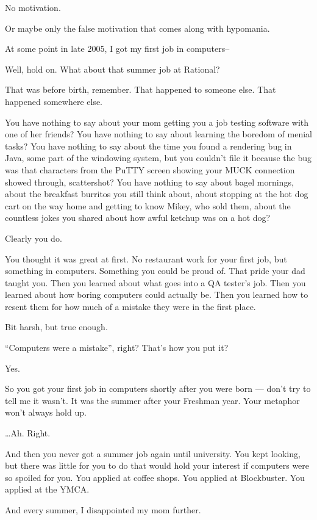 \begin{ally}
No motivation.
\end{ally}
Or maybe only the false motivation that comes along with hypomania.
\newpage

At some point in late 2005, I got my first job in computers--

\begin{ally}
Well, hold on. What about that summer job at Rational?
\end{ally}
That was before birth, remember. That happened to someone else. That happened somewhere else.

\begin{ally}
You have nothing to say about your mom getting you a job testing software with one of her friends? You have nothing to say about learning the boredom of menial tasks? You have nothing to say about the time you found a rendering bug in Java, some part of the windowing system, but you couldn't file it because the bug was that characters from the PuTTY screen showing your MUCK connection showed through, scattershot? You have nothing to say about bagel mornings, about the breakfast burritos you still think about, about stopping at the hot dog cart on the way home and getting to know Mikey, who sold them, about the countless jokes you shared about how awful ketchup was on a hot dog?
\end{ally}
Clearly you do.

\begin{ally}
You thought it was great at first. No restaurant work for your first job, but something in computers. Something you could be proud of. That pride your dad taught you. Then you learned about what goes into a QA tester's job. Then you learned about how boring computers could actually be. Then you learned how to resent them for how much of a mistake they were in the first place.
\end{ally}
Bit harsh, but true enough.

\begin{ally}
``Computers were a mistake'', right? That's how you put it?
\end{ally}
Yes.

\begin{ally}
So you got your first job in computers shortly after you were born --- don't try to tell me it wasn't. It was the summer after your Freshman year. Your metaphor won't always hold up.
\end{ally}
\ldots{}Ah. Right.

\begin{ally}
And then you never got a summer job again until university. You kept looking, but there was little for you to do that would hold your interest if computers were so spoiled for you. You applied at coffee shops. You applied at Blockbuster. You applied at the YMCA.
\end{ally}
And every summer, I disappointed my mom further.
\newpage

